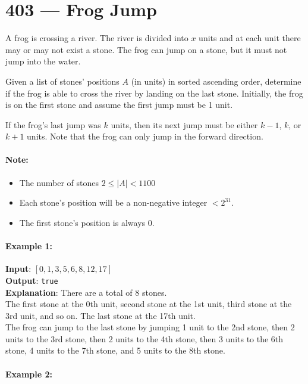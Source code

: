 \section{403 --- Frog Jump}
A frog is crossing a river. The river is divided into $x$ units and at each unit there may or may not exist a stone. The frog can jump on a stone, but it must not jump into the water.
\par
Given a list of stones' positions $A$ (in units) in sorted ascending order, determine if the frog is able to cross the river by landing on the last stone. Initially, the frog is on the first stone and assume the first jump must be 1 unit.
\par
If the frog's last jump was $ k $ units, then its next jump must be either $ k - 1 $, $ k $, or $ k + 1 $ units. Note that the frog can only jump in the forward direction.

\paragraph{Note:}

\begin{itemize}
\item The number of stones $2\leq \lvert A\rvert < 1100$
\item Each stone's position will be a non-negative integer $< 2^{31}$.
\item The first stone's position is always 0.
\end{itemize}

\paragraph{Example 1:}
\begin{flushleft}
\textbf{Input}: $[0,1,3,5,6,8,12,17]$
\\
\textbf{Output}: \texttt{true}
\\
\textbf{Explanation}:  There are a total of 8 stones.
\\
The first stone at the 0th unit, second stone at the 1st unit, third stone at the 3rd unit, and so on. The last stone at the 17th unit.
\\
The frog can jump to the last stone by jumping 
1 unit to the 2nd stone, then 2 units to the 3rd stone, then 
2 units to the 4th stone, then 3 units to the 6th stone, 
4 units to the 7th stone, and 5 units to the 8th stone.
\end{flushleft}

\paragraph{Example 2:}

